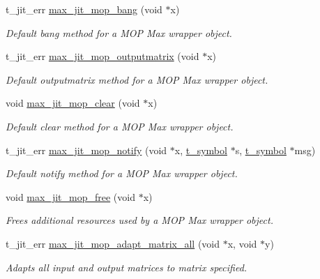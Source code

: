 \begin{DoxyCompactItemize}
t\_\-jit\_\-err \hyperlink{group__maxmopmod_ga2d8a375d2971f54b85315fb9f0d2bfc5}{max\_\-jit\_\-mop\_\-bang} (void $\ast$x)
\begin{DoxyCompactList}\small\item\em Default bang method for a MOP Max wrapper object. \item\end{DoxyCompactList}\item 
t\_\-jit\_\-err \hyperlink{group__maxmopmod_ga1b3db3947c815f9aeab49643f1b29402}{max\_\-jit\_\-mop\_\-outputmatrix} (void $\ast$x)
\begin{DoxyCompactList}\small\item\em Default outputmatrix method for a MOP Max wrapper object. \item\end{DoxyCompactList}\item 
void \hyperlink{group__maxmopmod_gab397419fccc40f7a17c6bff07458aee0}{max\_\-jit\_\-mop\_\-clear} (void $\ast$x)
\begin{DoxyCompactList}\small\item\em Default clear method for a MOP Max wrapper object. \item\end{DoxyCompactList}\item 
t\_\-jit\_\-err \hyperlink{group__maxmopmod_ga5032d682c77bcb7e2dcdf0e77d863d3c}{max\_\-jit\_\-mop\_\-notify} (void $\ast$x, \hyperlink{structt__symbol}{t\_\-symbol} $\ast$s, \hyperlink{structt__symbol}{t\_\-symbol} $\ast$msg)
\begin{DoxyCompactList}\small\item\em Default notify method for a MOP Max wrapper object. \item\end{DoxyCompactList}\item 
void \hyperlink{group__maxmopmod_ga441ff70d705e1eccff8297437c85e46c}{max\_\-jit\_\-mop\_\-free} (void $\ast$x)
\begin{DoxyCompactList}\small\item\em Frees additional resources used by a MOP Max wrapper object. \item\end{DoxyCompactList}\item 
t\_\-jit\_\-err \hyperlink{group__maxmopmod_ga896bfac67eb5e18c1c91fedebe8fe858}{max\_\-jit\_\-mop\_\-adapt\_\-matrix\_\-all} (void $\ast$x, void $\ast$y)
\begin{DoxyCompactList}\small\item\em Adapts all input and output matrices to matrix specified. \item\end{DoxyCompactList}\item 

\end{DoxyCompactItemize}

